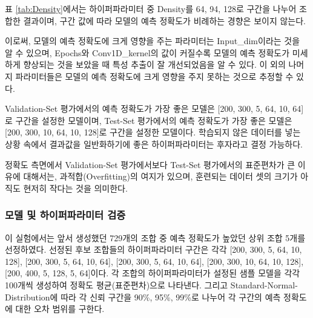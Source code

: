 \documentclass{kcc}
\begin{document}
표 \ref{tab:Density}에서는 하이퍼파라미터 중 Density를 64, 94, 128로 구간을 나누어 조합한 결과이며, 구간 값에 따라 모델의 예측 정확도가 비례하는 경향은 보이지 않는다.

이로써, 모델의 예측 정확도에 크게 영향을 주는 파라미터는 Input\_dim이라는 것을 알 수 있으며, Epochs와 Conv1D\_kernel의 값이 커질수록 모델의 예측 정확도가 미세하게 향상되는 것을 보았을 때 특성 추출이 잘 개선되었음을 알 수 있다. 이 외의 나머지 파라미터들은 모델의 예측 정확도에 크게 영향을 주지 못하는 것으로 추정할 수 있다.

Validation-Set 평가에서의 예측 정확도가 가장 좋은 모델은 [200, 300, 5, 64, 10, 64]로 구간을 설정한 모델이며, Test-Set 평가에서의 예측 정확도가 가장 좋은 모델은 [200, 300, 10, 64, 10, 128]로 구간을 설정한 모델이다. 학습되지 않은 데이터를 넣는 상황 속에서 결과값을 일반화하기에 좋은 하이퍼파라미터는 후자라고 결정 가능하다.

정확도 측면에서 Validation-Set 평가에서보다 Test-Set 평가에서의 표준편차가 큰 이유에 대해서는, 과적합(Overfitting)\cite{cite:overfitting}의 여지가 있으며, 훈련되는 데이터 셋의 크기가 아직도 현저히 작다는 것을 의미한다.

\subsubsection{모델 및 하이퍼파라미터 검증}

이 실험에서는 앞서 생성했던 729개의 조합 중 예측 정확도가 높았던 상위 조합 5개를 선정하였다. 선정된 후보 조합들의 하이퍼파라미터 구간은 각각 [200, 300, 5, 64, 10, 128], [200, 300, 5, 64, 10, 64], [200, 300, 5, 64, 10, 64], [200, 300, 10, 64, 10, 128], [200, 400, 5, 128, 5, 64]이다. 각 조합의 하이퍼파라미터가 설정된 샘플 모델을 각각 100개씩 생성하여 정확도 평균(표준편차)으로 나타낸다. 그리고 Standard-Normal-Distribution에 따라 각 신뢰 구간을 90\%, 95\%, 99\%로 나누어 각 구간의 예측 정확도에 대한 오차 범위를 구한다.
\end{document}
